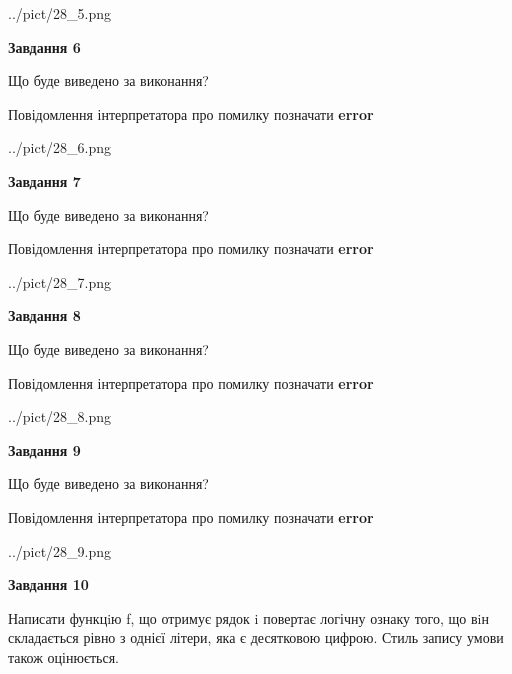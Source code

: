 \documentclass[12pt, ukrainian]{article}
\begin{document}
{\begin {large}
\begin{center}
	{../pict/28_5.png}
\end{center}
\newpage

{\begin {center}\textbf{Завдання 6}\end {center}}\par
Що буде виведено за виконання? \par
Повідомлення інтерпретатора про помилку позначати \textbf{error}

\begin{center}
	{../pict/28_6.png}
\end{center}
\newpage

{\begin {center}\textbf{Завдання 7}\end {center}}\par
Що буде виведено за виконання? \par
Повідомлення інтерпретатора про помилку позначати \textbf{error}

\begin{center}
	{../pict/28_7.png}
\end{center}
\newpage

{\begin {center}\textbf{Завдання 8}\end {center}}\par
Що буде виведено за виконання? \par
Повідомлення інтерпретатора про помилку позначати \textbf{error}

\begin{center}
	{../pict/28_8.png}
\end{center}
\newpage

{\begin {center}\textbf{Завдання 9}\end {center}}\par
Що буде виведено за виконання? \par
Повідомлення інтерпретатора про помилку позначати \textbf{error}

\begin{center}
	{../pict/28_9.png}
\end{center}
\newpage

{\begin {center}\textbf{Завдання 10}\end {center}}\par

Написати функцiю f, що отримує рядок i повертає логічну ознаку того, що вiн складається рівно з однієї літери, яка є десятковою цифрою. Стиль запису умови також оцінюється.\par
\newpage

\end {large}}
\end{document}
